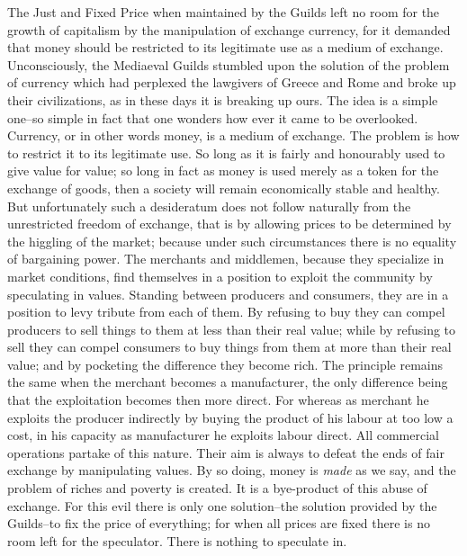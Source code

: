 \documentclass{book}
\begin{document}
The Just and Fixed Price when maintained by the Guilds left no room for the growth of capitalism by the manipulation of exchange currency, for it demanded that money should be restricted to its legitimate use as a medium of exchange. Unconsciously, the Mediaeval Guilds stumbled upon the solution of the problem of currency which had perplexed the lawgivers of Greece and Rome and broke up their civilizations, as in these days it is breaking up ours. The idea is a simple one–so simple in fact that one wonders how ever it came to be overlooked. Currency, or in other words money, is a medium of exchange. The problem is how to restrict it to its legitimate use. So long as it is fairly and honourably used to give value for value; so long in fact as money is used merely as a token for the exchange of goods, then a society will remain economically stable and healthy. But unfortunately such a desideratum does not follow naturally from the unrestricted freedom of exchange, that is by allowing prices to be determined by the higgling of the market; because under such circumstances there is no equality of bargaining power. The merchants and middlemen, because they specialize in market conditions, find themselves in a position to exploit the community by speculating in values. Standing between producers and consumers, they are in a position to levy tribute from each of them. By refusing to buy they can compel producers to sell things to them at less than their real value; while by refusing to sell they can compel consumers to buy things from them at more than their real value; and by pocketing the difference they become rich. The principle remains the same when the merchant becomes a manufacturer, the only difference being that the exploitation becomes then more direct. For whereas as merchant he exploits the producer indirectly by buying the product of his labour at too low a cost, in his capacity as manufacturer he exploits labour direct. All commercial operations partake of this nature. Their aim is always to defeat the ends of fair exchange by manipulating values. By so doing, money is \emph{made} as we say, and the problem of riches and poverty is created. It is a bye-product of this abuse of exchange. For this evil there is only one solution–the solution provided by the Guilds–to fix the price of everything; for when all prices are fixed there is no room left for the speculator. There is nothing to speculate in.
\end{document}
